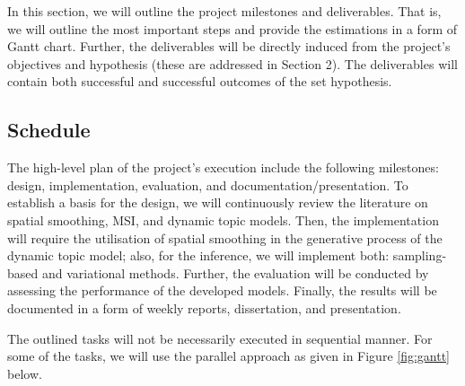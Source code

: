 \documentclass{mprop}
\begin{document}
\par In this section, we will outline the project milestones and deliverables. That is, we will outline the most important steps and provide the estimations in a form of Gantt chart. Further, the deliverables will be directly induced from the project's objectives and hypothesis (these are addressed in Section 2). The deliverables will contain both successful and successful outcomes of the set hypothesis.

\subsection{Schedule}

\par The high-level plan of the project's execution include the following milestones: design, implementation, evaluation, and documentation/presentation. To establish a basis for the design, we will continuously review the literature on spatial smoothing, MSI, and dynamic topic models. Then, the implementation will require the utilisation of spatial smoothing in the generative process of the dynamic topic model; also, for the inference, we will implement both: sampling-based and variational methods. Further, the evaluation will be conducted by assessing the performance of the developed models. Finally, the results will be documented in a form of weekly reports, dissertation, and presentation.

\par The outlined tasks will not be necessarily executed in sequential manner. For some of the tasks, we will use the parallel approach as given in Figure \ref{fig:gantt} below.
\end{document}
